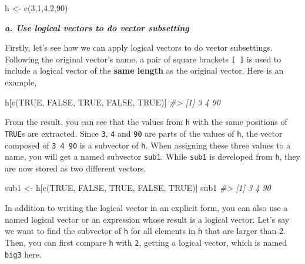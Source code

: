\documentclass[
]{book}
\newenvironment{Shaded}{\begin{snugshade}}{\end{snugshade}}
\newcommand{\CommentTok}[1]{\textcolor[rgb]{0.56,0.35,0.01}{\textit{#1}}}
\newcommand{\ConstantTok}[1]{\textcolor[rgb]{0.00,0.00,0.00}{#1}}
\newcommand{\DecValTok}[1]{\textcolor[rgb]{0.00,0.00,0.81}{#1}}
\newcommand{\FunctionTok}[1]{\textcolor[rgb]{0.00,0.00,0.00}{#1}}
\newcommand{\NormalTok}[1]{#1}
\newcommand{\OtherTok}[1]{\textcolor[rgb]{0.56,0.35,0.01}{#1}}
\begin{document}
\begin{Shaded}
\begin{Highlighting}[]
\NormalTok{h }\OtherTok{\textless{}{-}} \FunctionTok{c}\NormalTok{(}\DecValTok{3}\NormalTok{,}\DecValTok{1}\NormalTok{,}\DecValTok{4}\NormalTok{,}\DecValTok{2}\NormalTok{,}\DecValTok{90}\NormalTok{)}
\end{Highlighting}
\end{Shaded}

\textbf{\emph{a. Use logical vectors to do vector subsetting}}

Firstly, let's see how we can apply logical vectors to do vector subsettings. Following the original vector's name, a pair of square brackets \texttt{{[}\ {]}} is used to include a logical vector of the \textbf{same length} as the original vector. Here is an example,

\begin{Shaded}
\begin{Highlighting}[]
\NormalTok{h[}\FunctionTok{c}\NormalTok{(}\ConstantTok{TRUE}\NormalTok{, }\ConstantTok{FALSE}\NormalTok{, }\ConstantTok{TRUE}\NormalTok{, }\ConstantTok{FALSE}\NormalTok{, }\ConstantTok{TRUE}\NormalTok{)]}
\CommentTok{\#\textgreater{} [1]  3  4 90}
\end{Highlighting}
\end{Shaded}

From the result, you can see that the values from \texttt{h} with the same positions of \texttt{TRUE}s are extracted. Since \texttt{3}, \texttt{4} and \texttt{90} are parts of the values of \texttt{h}, the vector composed of \texttt{3\ 4\ 90} is a subvector of \texttt{h}. When assigning these three values to a name, you will get a named subvector \texttt{sub1}. While \texttt{sub1} is developed from \texttt{h}, they are now stored as two different vectors.

\begin{Shaded}
\begin{Highlighting}[]
\NormalTok{sub1 }\OtherTok{\textless{}{-}}\NormalTok{ h[}\FunctionTok{c}\NormalTok{(}\ConstantTok{TRUE}\NormalTok{, }\ConstantTok{FALSE}\NormalTok{, }\ConstantTok{TRUE}\NormalTok{, }\ConstantTok{FALSE}\NormalTok{, }\ConstantTok{TRUE}\NormalTok{)]}
\NormalTok{sub1}
\CommentTok{\#\textgreater{} [1]  3  4 90}
\end{Highlighting}
\end{Shaded}

In addition to writing the logical vector in an explicit form, you can also use a named logical vector or an expression whose result is a logical vector. Let's say we want to find the subvector of \texttt{h} for all elements in \texttt{h} that are larger than 2. Then, you can first compare \texttt{h} with \texttt{2}, getting a logical vector, which is named \texttt{big3} here.
\end{document}
